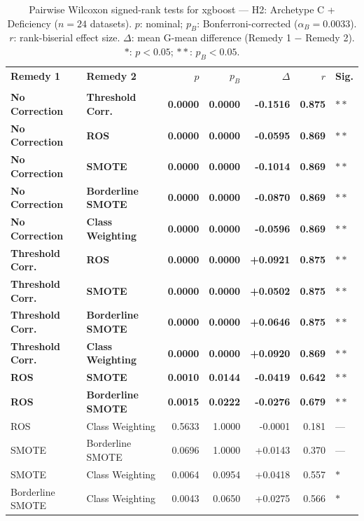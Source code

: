 \begin{table}[ht]
\centering
\scriptsize
\caption{Pairwise Wilcoxon signed-rank tests for xgboost --- H2: Archetype C + Deficiency ($n=24$ datasets). $p$: nominal; $p_B$: Bonferroni-corrected ($\alpha_B=0.0033$). $r$: rank-biserial effect size. $\Delta$: mean G-mean difference (Remedy 1 $-$ Remedy 2). $\ast$: $p<0.05$; $\ast\ast$: $p_B<0.05$.}
\label{tab:wilcoxon_xgboost_h2}
\begin{tabular}{llrrrrl}
\toprule
\textbf{Remedy 1} & \textbf{Remedy 2} & \textbf{$p$} & \textbf{$p_B$} & \textbf{$\Delta$} & \textbf{$r$} & \textbf{Sig.} \\\\
\midrule
    \textbf{No Correction} & \textbf{Threshold Corr.} & \textbf{0.0000} & \textbf{0.0000} & \textbf{-0.1516} & \textbf{0.875} & $\ast\ast$ \\
    \textbf{No Correction} & \textbf{ROS} & \textbf{0.0000} & \textbf{0.0000} & \textbf{-0.0595} & \textbf{0.869} & $\ast\ast$ \\
    \textbf{No Correction} & \textbf{SMOTE} & \textbf{0.0000} & \textbf{0.0000} & \textbf{-0.1014} & \textbf{0.869} & $\ast\ast$ \\
    \textbf{No Correction} & \textbf{Borderline SMOTE} & \textbf{0.0000} & \textbf{0.0000} & \textbf{-0.0870} & \textbf{0.869} & $\ast\ast$ \\
    \textbf{No Correction} & \textbf{Class Weighting} & \textbf{0.0000} & \textbf{0.0000} & \textbf{-0.0596} & \textbf{0.869} & $\ast\ast$ \\
    \textbf{Threshold Corr.} & \textbf{ROS} & \textbf{0.0000} & \textbf{0.0000} & \textbf{+0.0921} & \textbf{0.875} & $\ast\ast$ \\
    \textbf{Threshold Corr.} & \textbf{SMOTE} & \textbf{0.0000} & \textbf{0.0000} & \textbf{+0.0502} & \textbf{0.875} & $\ast\ast$ \\
    \textbf{Threshold Corr.} & \textbf{Borderline SMOTE} & \textbf{0.0000} & \textbf{0.0000} & \textbf{+0.0646} & \textbf{0.875} & $\ast\ast$ \\
    \textbf{Threshold Corr.} & \textbf{Class Weighting} & \textbf{0.0000} & \textbf{0.0000} & \textbf{+0.0920} & \textbf{0.869} & $\ast\ast$ \\
    \textbf{ROS} & \textbf{SMOTE} & \textbf{0.0010} & \textbf{0.0144} & \textbf{-0.0419} & \textbf{0.642} & $\ast\ast$ \\
    \textbf{ROS} & \textbf{Borderline SMOTE} & \textbf{0.0015} & \textbf{0.0222} & \textbf{-0.0276} & \textbf{0.679} & $\ast\ast$ \\
    ROS & Class Weighting & 0.5633 & 1.0000 & -0.0001 & 0.181 & --- \\
    SMOTE & Borderline SMOTE & 0.0696 & 1.0000 & +0.0143 & 0.370 & --- \\
    SMOTE & Class Weighting & 0.0064 & 0.0954 & +0.0418 & 0.557 & $\ast$ \\
    Borderline SMOTE & Class Weighting & 0.0043 & 0.0650 & +0.0275 & 0.566 & $\ast$ \\
\bottomrule
\end{tabular}
\end{table}